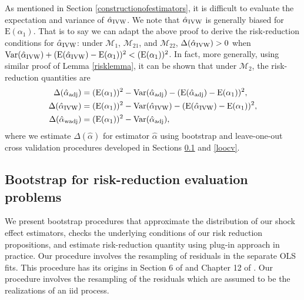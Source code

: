 \documentclass[11pt,3p,review,authoryear]{elsarticle}
\def\mc#1{\mathcal{#1}} %
\def\E#1{\mathrm{E}(#1)} %
\def\var#1{\mathrm{Var}(#1)} %
\theoremstyle{definition}
\begin{document}
As mentioned in Section \ref{constructionofestimators}, it is difficult to evaluate the expectation and variance of $\hat{\alpha}_{\rm IVW}$. We note that $\hat{\alpha}_{\rm IVW}$ is generally biased for $\E{\alpha_1}$. That is to say we can adapt the above proof to derive the risk-reduction conditions for $\hat{\alpha}_{\rm IVW}$: under $\mc{M}_{1}$, $\mc{M}_{21}$, and $\mc{M}_{22}$, $\Delta(\hat\alpha_{\rm IVW}) > 0$ when $\var{\hat{\alpha}_{\rm IVW}} +(\E{\hat{\alpha}_{\rm IVW}}-\E{\alpha_1})^2<(\E{\alpha_1})^2$.  In fact, more generally, using similar proof of Lemma \ref{risklemma}, it can be shown that under $\mc{M}_2$, the risk-reduction quantities are
\begin{align*}
  \Delta(\hat{\alpha}_{\rm adj}) 
  &= (\E{\alpha_1})^2 -\var{\hat{\alpha}_{\rm adj}}-(\E{\hat{\alpha}_{\rm adj}}-\E{\alpha_1})^2,\\
  \Delta(\hat{\alpha}_{\rm IVW}) 
  &= (\E{\alpha_1})^2 -\var{\hat{\alpha}_{\rm IVW}}-(\E{\hat{\alpha}_{\rm IVW}}-\E{\alpha_1})^2 ,\\
  \Delta(\hat{\alpha}_{\rm wadj}) 
  &= (\E{\alpha_1})^2 -\var{\hat{\alpha}_{\rm adj}},
\end{align*}
where we estimate $\Delta(\hat{\alpha})$ for estimator $\hat\alpha$  using bootstrap and leave-one-out cross validation procedures developed in Sections \ref{varbootstrap} and \ref{loocv}. 
 


\subsection{Bootstrap for risk-reduction evaluation problems}
\label{varbootstrap}


We present bootstrap procedures that approximate the distribution of our shock effect estimators, checks the underlying conditions of our risk reduction propositions, and estimate risk-reduction quantity using plug-in approach in practice. Our procedure involves the resampling of residuals in the separate OLS fits. This procedure has its origins in Section 6 of \citet{efron1986bootstrap} and Chapter 12 of \cite{kilian2017structural}. Our procedure involves the resampling of the residuals which are assumed to be the realizations of an iid process.
\end{document}

